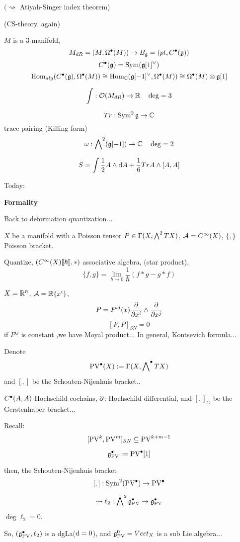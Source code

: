 $(\rightsquigarrow$ Atiyah-Singer index theorem)

\begin{example}(CS-theory, again)

$M$ is a $3$-manifold, 
$$M_{dR}=(M,\Omega^{\bullet}(M))\to B_{\mathfrak{g}}=(pt,C^{\bullet}(\mathfrak{g}))$$
$$C^{\bullet}(\mathfrak{g})=\operatorname{Sym}(\mathfrak{g}[1]^\vee)$$
$$\operatorname{Hom}_{alg}(C^{\bullet}(\mathfrak{g}),\Omega^{\bullet}(M))
\cong\operatorname{Hom}_{\mathbb{C}}(\mathfrak{g}[-1]^\vee,\Omega^{\bullet}(M))
\cong \Omega^{\bullet}(M)\otimes\mathfrak{g}[1]$$

$$\int:\mathcal{O}(M_{dR})\to\mathbb{R}\quad \deg=3$$

$$Tr:\operatorname{Sym}^2\mathfrak{g}\to\mathbb{C}$$
trace pairing (Killing form)
$$\omega:\bigwedge\nolimits^{2}(\mathfrak{g}[-1])\to\mathbb{C}\quad\deg =2$$

$$S=\int \frac{1}{2}A\wedge\mathrm{d} A
+\frac{1}{6}Tr A\wedge [A,A]$$
\end{example}


Today:

\textbf{Formality}

Back to deformation quantization...

$X$ be a manifold with a Poisson tensor 
$P\in\Gamma(X,\bigwedge\nolimits^{2}TX)$,
$\mathcal{A}=C^\infty(X)$, $\{,\}$ Poisson bracket.

Quantize, $(C^\infty(X)[\![\hbar]\!],*)$
associative algebra, (star product),
$$\{f,g\}=\lim_{\hbar\to 0}
\frac{1}{\hbar}
\left(
  f*g-g*f
\right)$$

$X=\mathbb{R}^n$, $\mathcal{A}=\mathbb{R}\{x^i\}$,
$$P=P^{ij}(x)\frac{\partial } {\partial x^i}\wedge\frac{\partial } {\partial x^j}$$
$$[P,P]_{SN}=0$$
if $P^{ij}$ is constant ,we have Moyal product...
In general, Kontsevich formula...

Denote 
$$\operatorname{PV}^{\bullet}(X):=\Gamma(X,\bigwedge\nolimits^{\bullet}TX)$$
and $[,]$ be the Schouten-Nijenhuis bracket..

$C^{\bullet}(A,A)$ Hochschild cochains,
$\partial$: Hochschild differential, and $[,]_G$ be the Gerstenhaber bracket...

Recall:
$$[\operatorname{PV}^k,\operatorname{PV}^m]_{SN}\subseteq\operatorname{PV}^{k+m-1}$$

\begin{definition}
$$\mathfrak{g}_{\operatorname{PV}}^{\bullet}:=\operatorname{PV}^{\bullet}[1]$$

then, the Schouten-Nijenhuis bracket 
$$[,]:\operatorname{Sym}^2(\operatorname{PV}^{\bullet})\to\operatorname{PV}^{\bullet}$$

$$
  \rightsquigarrow
  \ell_2:\bigwedge\nolimits^{2}\mathfrak{g}_{\operatorname{PV}}^{\bullet}\to\mathfrak{g}_{\operatorname{PV}}^{\bullet}
$$
$\deg\ell_2=0$.
\end{definition}
So, $(\mathfrak{g}_{\operatorname{PV}}^{\bullet},\ell_2)$ is a dgLa($\mathrm{d}=0$),
and $\mathfrak{g}^0_{\operatorname{PV}}=Vect_X$ is a sub Lie algebra...


